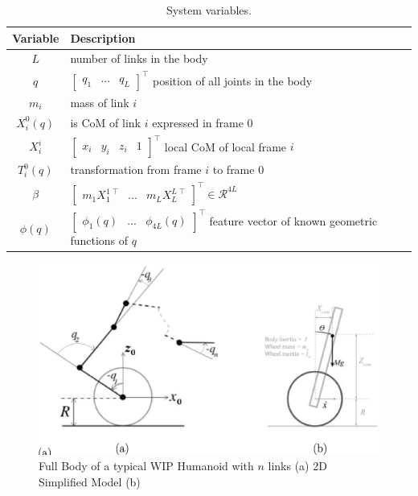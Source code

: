 \documentclass[letterpaper, 10 pt, conference]{ieeeconf}
\begin{document}
\begin{table}[b]
    \centering
    \caption{\label{tab:Variables}System variables.}
    \begin{tabular}{c|p{}}
    Variable & Description \\
    \hline
    $L$ & number of links in the body \\
    $q$ & $\begin{bmatrix} q_1 & ... & q_L \end{bmatrix}^\top$ position of all
    joints in the body \\
    $m_i$ & mass of link $i$ \\
    $X_i^0(q)$ & is CoM of link $i$ expressed in frame $0$ \\
    $X_i^i$ & $\begin{bmatrix} x_i & y_i & z_i & 1 \end{bmatrix}^\top$ local CoM
    of local frame $i$ \\
    $T_{i}^{0}(q)$ & transformation from frame $i$ to frame $0$ \\
    $\beta$ & $\begin{bmatrix} m_1X_1^{1\;\top} & ... & m_L X_L^{L\;\top}
    \end{bmatrix}^\top \in \mathcal{R}^{4L}$ \\
    $\phi(q)$ & $\begin{bmatrix} \phi_1(q) & ... & \phi_{4L}(q)
    \end{bmatrix}^\top$ feature vector of known geometric functions of $q$ \\
    \end{tabular}
\end{table}

\begin{figure}[htb]
	\centering
	\includegraphics[width=0.9\columnwidth]{figs/System2.eps}
    \vspace{-.5\baselineskip}
    \caption{Full Body of a typical WIP Humanoid with $n$ links (a) 2D
    Simplified Model (b)}
    \label{fig: system}
\end{figure}
\end{document}
